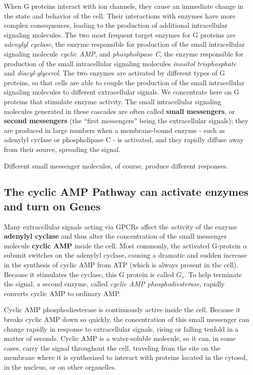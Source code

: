 When G proteins interact with ion channels, they cause an immediate
change in the state and behavior of the cell. Their interactions with
enzymes have more complex consequences, leading to the production
of additional intracellular signaling molecules. The two most frequent
target enzymes for G proteins are \textit{adenylyl cyclase}, the enzyme responsible
for production of the small intracellular signaling molecule \textit{cyclic
AMP}, and \textit{phospholipase C}, the enzyme responsible for production of the
small intracellular signaling molecules \textit{inositol trisphosphate} and \textit{diacyl-glycerol}.
The two enzymes are activated by different types of G proteins,
so that cells are able to couple the production of the small intracellular
signaling molecules to different extracellular signals. We concentrate
here on G proteins that stimulate enzyme activity. The small intracellular
signaling molecules generated in these cascades are often called \textbf{small
messengers}, or \textbf{second messengers} (the “first messengers” being the
extracellular signals); they are produced in large numbers when a membrane-bound
enzyme - such as adenylyl cyclase or phospholipase C - is
activated, and they rapidly diffuse away from their source, spreading the
signal.

Different small messenger molecules, of course, produce different
responses.

\subsection{The cyclic AMP Pathway can activate enzymes and turn on Genes}

Many extracellular signals acting via GPCRs affect the activity of the
enzyme \textbf{adenylyl cyclase} and thus alter the concentration of the small
messenger molecule \textbf{cyclic AMP} inside the cell. Most commonly, the
activated G-protein $\alpha$ subunit switches on the adenylyl cyclase, causing
a dramatic and sudden increase in the synthesis of cyclic AMP from ATP
(which is always present in the cell). Because it stimulates the cyclase,
this G protein is called $G_s$. To help terminate the signal, a second enzyme,
called \textit{cyclic AMP phosphodiesterase}, rapidly converts cyclic AMP to ordinary AMP.

Cyclic AMP phosphodiesterase is continuously active inside the cell.
Because it breaks cyclic AMP down so quickly, the concentration of this
small messenger can change rapidly in response to extracellular signals,
rising or falling tenfold in a matter of seconds. Cyclic AMP
is a water-soluble molecule, so it can, in some cases, carry the signal
throughout the cell, traveling from the site on the membrane where it is
synthesized to interact with proteins located in the cytosol, in the nucleus,
or on other organelles.

